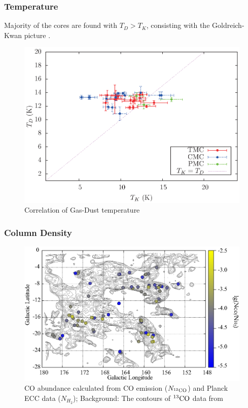 \documentclass{article}
\newcommand{\cob}{$\rm ^{13}CO$ }
\begin{document}
\subsubsection{Temperature}
    Majority of the cores are found with $T_D>T_K$, consisting with the  Goldreich- Kwan picture \citep{1974ApJ...189..441G}.
        \begin{figure}[H]
          \centering
          \includegraphics[totalheight=40 mm]{Gas-Dust_EB_Core.eps}
          \caption{Correlation of Gas-Dust temperature} \label{fig:ECCTemp_DIstribution}
       \end{figure}

\newpage
\subsubsection{Column Density}
\begin{figure}[h]
\centering
\includegraphics[totalheight=55mm]{SpatiaDist_Abundance_Overlay.eps}
\caption{CO abundance calculated from CO emission ($N_{^{12}\rm CO}$) and Planck ECC data ($N_{H_2}$); Background: The contours of \cob data from \citep{2001ApJ...547..792D}}
\end{figure}
\end{document}
